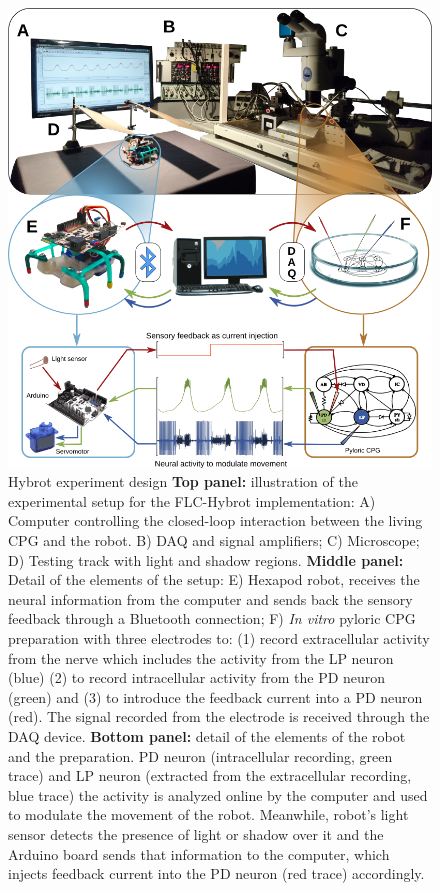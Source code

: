 \begin{figure}[h!]
	\begin{center}
		\includegraphics[width=0.65\linewidth]{img/invariants/robot/robot_results_setup.png}
	\end{center}
	\caption{Hybrot experiment design \textbf{Top panel:} illustration of the experimental setup for the FLC-Hybrot implementation: A) Computer controlling the closed-loop interaction between the living CPG and the robot. B) DAQ and signal amplifiers; C) Microscope; D) Testing track with light and shadow regions. \textbf{Middle panel:} Detail of the elements of the setup: E) Hexapod robot, receives the neural information from the computer and sends back the sensory feedback through a Bluetooth connection; F) \textit{In vitro} pyloric CPG preparation with three electrodes to: (1) record extracellular activity from the nerve which includes the activity from the LP neuron (blue) (2) to record intracellular activity from the PD neuron (green) and (3) to introduce the feedback current into a PD neuron (red). The signal recorded from the electrode is received through the DAQ device. \textbf{Bottom panel:} detail of the elements of the robot and the preparation. PD neuron (intracellular recording, green trace) and LP neuron (extracted from the extracellular recording, blue trace) the activity is analyzed online by the computer and used to modulate the movement of the robot. Meanwhile, robot's light sensor detects the presence of light or shadow over it and the Arduino board sends that information to the computer, which injects feedback current into the PD neuron (red trace) accordingly.}
	\label{fig:robot_results_setup}
\end{figure}


